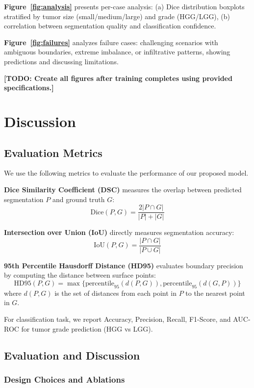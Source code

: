 \documentclass[runningheads]{llncs}
\begin{document}
\textbf{Figure~\ref{fig:analysis}} presents per-case analysis: (a) Dice distribution boxplots stratified by tumor size (small/medium/large) and grade (HGG/LGG), (b) correlation between segmentation quality and classification confidence.

\textbf{Figure~\ref{fig:failures}} analyzes failure cases: challenging scenarios with ambiguous boundaries, extreme imbalance, or infiltrative patterns, showing predictions and discussing limitations.

\textbf{[TODO: Create all figures after training completes using provided specifications.]}

%
%
\section{Discussion}

\subsection{Evaluation Metrics}

We use the following metrics to evaluate the performance of our proposed model.

\textbf{Dice Similarity Coefficient (DSC)} measures the overlap between predicted segmentation $P$ and ground truth $G$:
\[
\text{Dice}(P, G) = \frac{2|P \cap G|}{|P| + |G|}
\]

\textbf{Intersection over Union (IoU)} directly measures segmentation accuracy:
\[
\text{IoU}(P, G) = \frac{|P \cap G|}{|P \cup G|}
\]

\textbf{95th Percentile Hausdorff Distance (HD95)} evaluates boundary precision by computing the distance between surface points:
\[
\text{HD95}(P, G) = \max\{\text{percentile}_{95}(d(P, G)), \text{percentile}_{95}(d(G, P))\}
\]
where $d(P, G)$ is the set of distances from each point in $P$ to the nearest point in $G$.

For classification task, we report Accuracy, Precision, Recall, F1-Score, and AUC-ROC for tumor grade prediction (HGG vs LGG).

\subsection{Evaluation and Discussion}

\subsubsection{Design Choices and Ablations}
\end{document}
